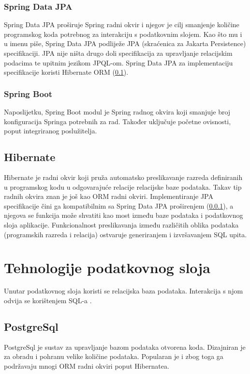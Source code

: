 \documentclass[times, utf8, zavrsni, numeric]{fer}
\begin{document}
			\subsubsection{Spring Data JPA}
			\label{subsubsec:spingdatajpa}
			Spring Data JPA proširuje Spring radni okvir i njegov je cilj smanjenje količine programskog koda potrebnog za interakciju s podatkovnim slojem. Kao što mu i u imenu piše, Spring Data JPA podliježe JPA (skraćenica za Jakarta Persistence) specifikaciji. JPA nije ništa drugo doli specifikacija za upravljanje relacijskim podacima te upitnim jezikom  JPQL-om. Spring Data JPA za implementaciju specifikacije koristi Hibernate ORM (\ref{subsec:hibernate}).
			\subsubsection{Spring Boot}
			Naposlijetku, Spring Boot modul je Spring radnog okvira koji smanjuje broj konfiguracija Springa potrebnih za rad. Također uključuje početne ovisnosti, poput integriranog poslužitelja.
			\subsection{Hibernate}
			\label{subsec:hibernate}
			Hibernate\cite{hibernate2021} je radni okvir koji pruža automatsko preslikavanje razreda definiranih u programskog kodu u odgovarajuće relacije relacijske baze podataka. Takav tip radnih okvira znan je još kao ORM  radni okviri. Implementiranje JPA specifikacije čini ga kompatibilnim sa Spring Data JPA proširenjem (\ref{subsubsec:spingdatajpa}), a njegova se funkcija može shvatiti kao most između baze podataka  i podatkovnog sloja aplikacije. Funkcionalnost preslikavanja između različitih oblika podataka (programskih razreda i relacija) ostvaruje generiranjem i izvršavanjem SQL upita.
	
	
		\section{Tehnologije podatkovnog sloja}
		Unutar podatkovnog sloja koristi se relacijska baza podataka. Interakcija s njom odvija se korištenjem SQL-a .
			\subsection{PostgreSql}
			PostgreSql\cite{postgresql2021} je sustav za upravljanje bazom podataka otvorena koda. Dizajniran je za obradu i pohranu velike količine podataka. Popularan je i zbog toga ga podržavaju mnogi ORM radni okviri poput Hibernatea.
\end{document}
